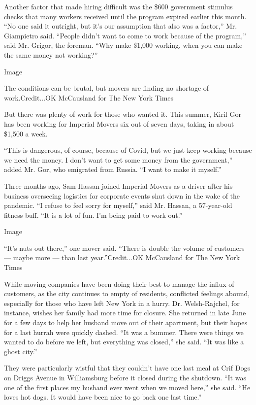 Another factor that made hiring difficult was the \$600 government
stimulus checks that many workers received until the program expired
earlier this month. ``No one said it outright, but it's our assumption
that also was a factor,'' Mr. Giampietro said. ``People didn't want to
come to work because of the program,'' said Mr. Grigor, the foreman.
``Why make \$1,000 working, when you can make the same money not
working?''

Image

The conditions can be brutal, but movers are finding no shortage of
work.Credit...OK McCausland for The New York Times

But there was plenty of work for those who wanted it. This summer, Kiril
Gor has been working for Imperial Movers six out of seven days, taking
in about \$1,500 a week.

``This is dangerous, of course, because of Covid, but we just keep
working because we need the money. I don't want to get some money from
the government,'' added Mr. Gor, who emigrated from Russia. ``I want to
make it myself.''

Three months ago, Sam Hassan joined Imperial Movers as a driver after
his business overseeing logistics for corporate events shut down in the
wake of the pandemic. ``I refuse to feel sorry for myself,'' said Mr.
Hassan, a 57-year-old fitness buff. ``It is a lot of fun. I'm being paid
to work out.''

Image

``It's nuts out there,'' one mover said. ``There is double the volume of
customers --- maybe more --- than last year.''Credit...OK McCausland for
The New York Times

While moving companies have been doing their best to manage the influx
of customers, as the city continues to empty of residents, conflicted
feelings abound, especially for those who have left New York in a hurry.
Dr. Welsh-Rajchel, for instance, wishes her family had more time for
closure. She returned in late June for a few days to help her husband
move out of their apartment, but their hopes for a last hurrah were
quickly dashed. ``It was a bummer. There were things we wanted to do
before we left, but everything was closed,'' she said. ``It was like a
ghost city.''

They were particularly wistful that they couldn't have one last meal at
Crif Dogs on Driggs Avenue in Williamsburg before it closed during the
shutdown. ``It was one of the first places my husband ever went when we
moved here,'' she said. ``He loves hot dogs. It would have been nice to
go back one last time.''

